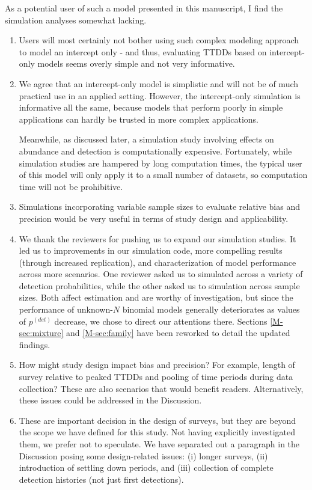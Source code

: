 \documentclass[12pt]{article}
\renewenvironment{quote}  %
              {\list{}{\rightmargin\leftmargin}\normalfont%
               \item\relax}
              {\endlist}
\newcommand{\pdet}{p^{(det)}}
\begin{document}
As a potential user of such a model presented in this manuscript, I find the simulation analyses somewhat lacking.   
\begin{enumerate}
\item Users will most certainly not bother using such complex modeling approach to model an intercept only - and thus, evaluating TTDDs based on intercept-only models seems overly simple and not very informative. \begin{quote}
We agree that an intercept-only model is simplistic and will not be of much practical use in an applied setting.
However, the intercept-only simulation is informative all the same, because models that perform poorly in simple applications can hardly be trusted in more complex applications.

Meanwhile, as discussed later, a simulation study involving effects on abundance and detection is computationally expensive.
Fortunately, while simulation studies are hampered by long computation times, the typical user of this model will only apply it to a small number of datasets, so computation time will not be prohibitive.
\end{quote}

\item Simulations incorporating variable sample sizes to evaluate relative bias and precision would be very useful in terms of study design and applicability.  
\begin{quote}
We thank the reviewers for pushing us to expand our simulation studies.
It led us to improvements in our simulation code, more compelling results (through increased replication), and characterization of model performance across more scenarios.
One reviewer asked us to simulated across a variety of detection probabilities, while the other asked us to simulation across sample sizes.
Both affect estimation and are worthy of investigation, but since the performance of unknown-$N$ binomial models generally deteriorates as values of $\pdet$ decrease, we chose to direct our attentions there.
Sections \ref{M-sec:mixture} and \ref{M-sec:family} have been reworked to detail the updated findings.
\end{quote}

\item How might study design impact bias and precision?  For example, length of survey relative to peaked TTDDs and pooling of time periods during data collection?  These are also scenarios that would benefit readers.  Alternatively, these issues could be addressed in the Discussion.
\begin{quote}
These are important decision in the design of surveys, but they are beyond the scope we have defined for this study.
Not having explicitly investigated them, we prefer not to speculate.
We have separated out a paragraph in the Discussion posing some design-related issues: (i) longer surveys, (ii) introduction of settling down periods, and (iii) collection of complete detection histories (not just first detections).
\end{quote}


\end{enumerate}
\end{document}
